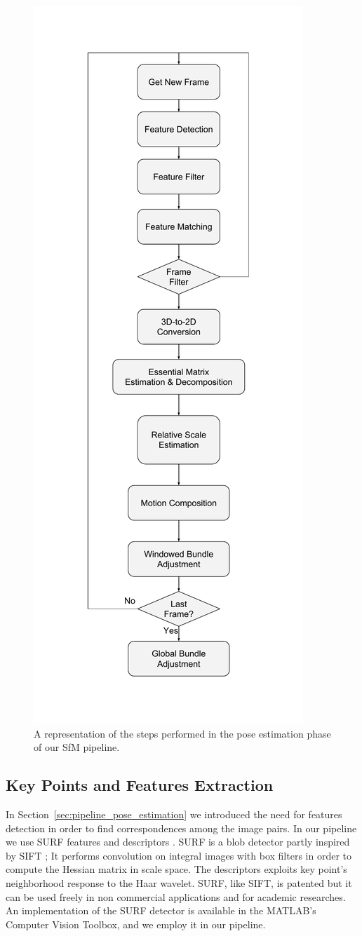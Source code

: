 \begin{figure}
	\centering
	\includegraphics[width=0.5\linewidth]{img/sfm_block}
	\caption{A representation of the steps performed in the pose estimation 
	phase of our SfM pipeline.}
	\label{fig:sfm_block}
\end{figure}

\subsection{Key Points and Features Extraction}
In Section~\ref{sec:pipeline_pose_estimation} we introduced the need for 
features detection in order to find correspondences among the image pairs.
In our pipeline we use SURF features and descriptors 
\cite{bay2006surf}. SURF is a blob detector partly inspired by SIFT
\cite{lowe1999object};
It performs convolution on integral images with box filters in order to 
compute the Hessian matrix in scale space.
The descriptors exploits key point's neighborhood response to the Haar wavelet.
SURF, like SIFT, is patented but it can be used freely in non commercial
applications and for academic researches.
An implementation of the SURF detector is available in the MATLAB's Computer 
Vision Toolbox, and we employ it in our pipeline.

